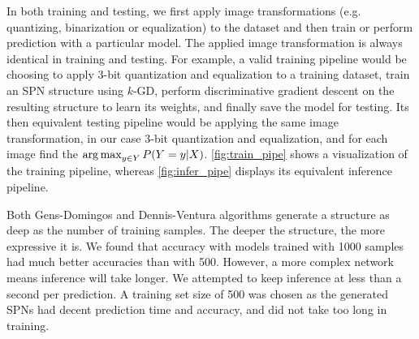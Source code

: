 In both training and testing, we first apply image transformations (e.g. quantizing, binarization
or equalization) to the dataset and then train or perform prediction with a particular model. The
applied image transformation is always identical in training and testing. For example, a valid
training pipeline would be choosing to apply 3-bit quantization and equalization to a training
dataset, train an SPN structure using $k$-GD, perform discriminative gradient descent on the
resulting structure to learn its weights, and finally save the model for testing. Its then
equivalent testing pipeline would be applying the same image transformation, in our case 3-bit
quantization and equalization, and for each image find the $\operatorname*{arg\,max}_{y\in Y} P(Y=y|X)$.
\autoref{fig:train_pipe} shows a visualization of the training pipeline, whereas
\autoref{fig:infer_pipe} displays its equivalent inference pipeline.

Both Gens-Domingos and Dennis-Ventura algorithms generate a structure as deep as the number of
training samples. The deeper the structure, the more expressive it is. We found that accuracy with
models trained with 1000 samples had much better accuracies than with 500. However, a more complex
network means inference will take longer. We attempted to keep inference at less than a second per
prediction. A training set size of 500 was chosen as the generated SPNs had decent prediction time
and accuracy, and did not take too long in training.

